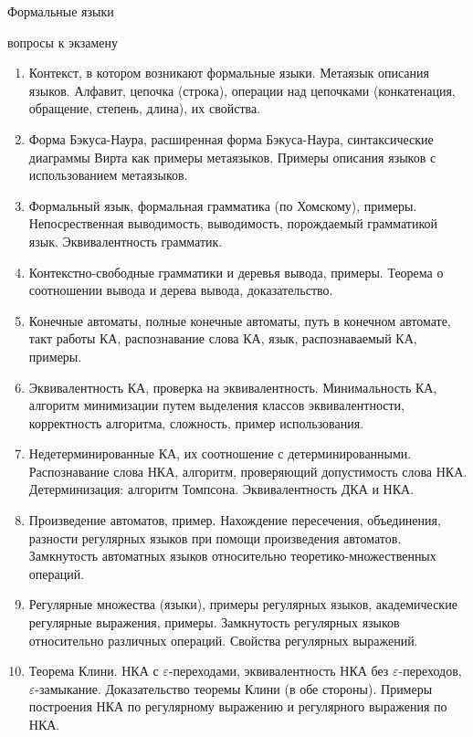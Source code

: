 \documentclass[12pt]{article}
\begin{document}
\begin{center}
  \LARGE Формальные языки

  \Large вопросы к экзамену
\end{center}

\begin{enumerate}
\item {Контекст, в котором возникают формальные языки. Метаязык описания языков. Алфавит, цепочка (строка), операции над цепочками (конкатенация, обращение, степень, длина), их свойства.}
  \item {Форма Бэкуса-Наура, расширенная форма Бэкуса-Наура, синтаксические диаграммы Вирта как примеры метаязыков. Примеры описания языков с использованием метаязыков. }
  \item {Формальный язык, формальная грамматика (по Хомскому), примеры. Непосрественная выводимость, выводимость, порождаемый грамматикой язык. Эквивалентность грамматик. }
  \item {Контекстно-свободные грамматики и деревья вывода, примеры. Теорема о соотношении вывода и дерева вывода, доказательство.}
  \item {Конечные автоматы, полные конечные автоматы, путь в конечном автомате, такт работы КА, распознавание слова КА, язык, распознаваемый КА, примеры. }
  \item {Эквивалентность КА, проверка на эквивалентность. Минимальность КА, алгоритм минимизации путем выделения классов эквивалентности, корректность алгоритма, сложность, пример использования. }
  \item {Недетерминированные КА, их соотношение с детерминированными. Распознавание слова НКА, алгоритм, проверяющий допустимость слова НКА. Детерминизация: алгоритм Томпсона. Эквивалентность ДКА и НКА.}
  \item {Произведение автоматов, пример. Нахождение пересечения, объединения, разности регулярных языков при помощи произведения автоматов. Замкнутость автоматных языков относительно теоретико-множественных операций. }
  \item {Регулярные множества (языки), примеры регулярных языков, академические регулярные выражения, примеры. Замкнутость регулярных языков относительно различных операций. Свойства регулярных выражений. }
  \item {Теорема Клини. НКА с $\varepsilon$-переходами, эквивалентность НКА без $\varepsilon$-переходов, $\varepsilon$-замыкание. Доказательство теоремы Клини (в обе стороны). Примеры построения НКА по регулярному выражению и регулярного выражения по НКА.}

\end{enumerate}
\end{document}
